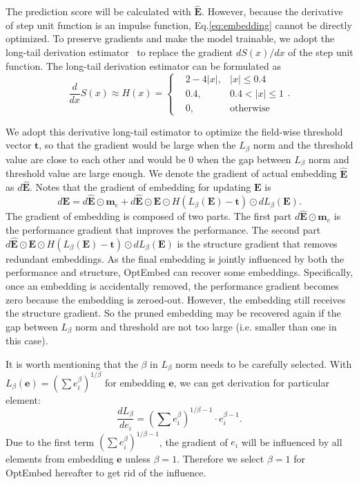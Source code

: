 \documentclass[sigconf]{acmart}
\begin{document}
The prediction score will be calculated with $\mathbf{\hat{E}}$. However, because the derivative of step unit function is an impulse function, Eq.\ref{eq:embedding} cannot be directly optimized. To preserve gradients and make the model trainable, we adopt the long-tail derivation estimator~\cite{DST} to replace the gradient $dS(x)/{dx}$ of the step unit function. The long-tail derivation estimator can be formulated as
\begin{equation}
    \frac{d}{dx}S(x) \approx H(x) = \left\{ 
    \begin{aligned}
        &2-4|x|, &|x|\leq 0.4 \\
        &0.4, &0.4<|x|\leq 1 \\
        &0, &\text{otherwise}
    \end{aligned}
    \right. .
\end{equation}

We adopt this derivative long-tail estimator to optimize the field-wise threshold vector $\mathbf{t}$, so that the gradient would be large when the $L_{\beta}$ norm and the threshold value are close to each other and would be 0 when the gap between $L_{\beta}$ norm and threshold value are large enough. We denote the gradient of actual embedding $\mathbf{\hat{E}}$ as $d\mathbf{\hat{E}}$. Notes that the gradient of embedding for updating $\mathbf{E}$ is 
\begin{equation}
    d\mathbf{E} = d\mathbf{\hat{E}} \odot \mathbf{m}_e + d\mathbf{\hat{E}} \odot \mathbf{E} \odot H(L_{\beta}(\mathbf{E}) - \mathbf{t}) \odot dL_{\beta}(\mathbf{E}).
\end{equation}
The gradient of embedding is composed of two parts. The first part $d\mathbf{\hat{E}} \odot \mathbf{m}_e$ is the performance gradient that improves the performance. The second part $d\mathbf{\hat{E}} \odot \mathbf{E} \odot H(L_{\beta}(\mathbf{E}) - \mathbf{t}) \odot dL_{\beta}(\mathbf{E})$ is the structure gradient that removes redundant embeddings. As the final embedding is jointly influenced by both the performance and structure, OptEmbed can recover some embeddings. Specifically, once an embedding is accidentally removed, the performance gradient becomes zero because the embedding is zeroed-out. However, the embedding still receives the structure gradient. So the pruned embedding may be recovered again if the gap between $L_{\beta}$ norm and threshold are not too large (i.e. smaller than one in this case).



It is worth mentioning that the $\beta$ in $L_{\beta}$ norm needs to be carefully selected. With $L_{\beta}(\mathbf{e}) = (\sum e_i^{\beta})^{1/\beta}$ for embedding $\mathbf{e}$, we can get derivation for particular element:
\begin{equation}
\frac{dL_{\beta}}{de_i} = (\sum e_i^{\beta})^{1/\beta-1} \cdot e_i^{\beta-1}.
\end{equation}
Due to the first term $(\sum e_i^{\beta})^{1/\beta-1}$, the gradient of $e_i$ will be influenced by all elements from embedding $\mathbf{e}$ unless $\beta=1$. Therefore we select $\beta=1$ for OptEmbed hereafter to get rid of the influence.
\end{document}
